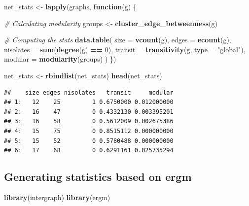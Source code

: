 \documentclass[
]{book}
\newenvironment{Shaded}{\begin{snugshade}}{\end{snugshade}}
\newcommand{\AttributeTok}[1]{\textcolor[rgb]{0.13,0.29,0.53}{#1}}
\newcommand{\CommentTok}[1]{\textcolor[rgb]{0.56,0.35,0.01}{\textit{#1}}}
\newcommand{\ControlFlowTok}[1]{\textcolor[rgb]{0.13,0.29,0.53}{\textbf{#1}}}
\newcommand{\DecValTok}[1]{\textcolor[rgb]{0.00,0.00,0.81}{#1}}
\newcommand{\FunctionTok}[1]{\textcolor[rgb]{0.13,0.29,0.53}{\textbf{#1}}}
\newcommand{\NormalTok}[1]{#1}
\newcommand{\OtherTok}[1]{\textcolor[rgb]{0.56,0.35,0.01}{#1}}
\newcommand{\SpecialCharTok}[1]{\textcolor[rgb]{0.81,0.36,0.00}{\textbf{#1}}}
\newcommand{\StringTok}[1]{\textcolor[rgb]{0.31,0.60,0.02}{#1}}
\begin{document}
\begin{Shaded}
\begin{Highlighting}[]
\NormalTok{net\_stats }\OtherTok{\textless{}{-}} \FunctionTok{lapply}\NormalTok{(graphs, }\ControlFlowTok{function}\NormalTok{(g) \{}
  
  \CommentTok{\# Calculating modularity}
\NormalTok{  groups }\OtherTok{\textless{}{-}} \FunctionTok{cluster\_edge\_betweenness}\NormalTok{(g)}
  
  \CommentTok{\# Computing the stats}
  \FunctionTok{data.table}\NormalTok{(}
    \AttributeTok{size      =} \FunctionTok{vcount}\NormalTok{(g),}
    \AttributeTok{edges     =} \FunctionTok{ecount}\NormalTok{(g),}
    \AttributeTok{nisolates =} \FunctionTok{sum}\NormalTok{(}\FunctionTok{degree}\NormalTok{(g) }\SpecialCharTok{==} \DecValTok{0}\NormalTok{),}
    \AttributeTok{transit   =} \FunctionTok{transitivity}\NormalTok{(g, }\AttributeTok{type =} \StringTok{"global"}\NormalTok{),}
    \AttributeTok{modular   =} \FunctionTok{modularity}\NormalTok{(groups)}
\NormalTok{  )}
\NormalTok{\})}

\NormalTok{net\_stats }\OtherTok{\textless{}{-}} \FunctionTok{rbindlist}\NormalTok{(net\_stats)}
\FunctionTok{head}\NormalTok{(net\_stats)}
\end{Highlighting}
\end{Shaded}

\begin{verbatim}
##    size edges nisolates   transit     modular
## 1:   12    25         1 0.6750000 0.012000000
## 2:   16    47         0 0.4332130 0.003395201
## 3:   16    58         0 0.5612009 0.002675386
## 4:   15    75         0 0.8515112 0.000000000
## 5:   15    52         0 0.5780488 0.000000000
## 6:   17    68         0 0.6291161 0.025735294
\end{verbatim}

\hypertarget{generating-statistics-based-on-ergm}{%
\subsection{Generating statistics based on ergm}\label{generating-statistics-based-on-ergm}}

\begin{Shaded}
\begin{Highlighting}[]
\FunctionTok{library}\NormalTok{(intergraph)}
\FunctionTok{library}\NormalTok{(ergm)}
\end{Highlighting}
\end{Shaded}
\end{document}
